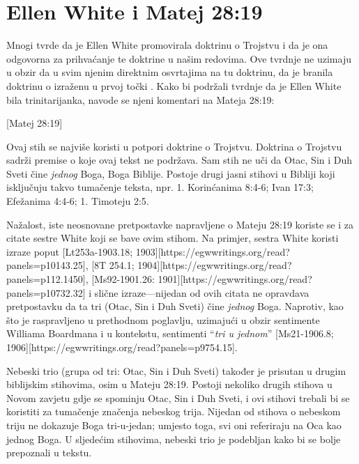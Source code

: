 \chapter{Ellen White i Matej 28:19}

Mnogi tvrde da je Ellen White promovirala doktrinu o Trojstvu i da je ona odgovorna za prihvaćanje te doktrine u našim redovima. Ove tvrdnje ne uzimaju u obzir da u svim njenim direktnim osvrtajima na tu doktrinu, da je branila  doktrinu o  izraženu u prvoj točki . Kako bi podržali tvrdnje da je Ellen White bila trinitarijanka, navode se njeni komentari na Mateja 28:19:

[Matej 28:19]

Ovaj stih se najviše koristi u potpori doktrine o Trojstvu. Doktrina o Trojstvu sadrži premise o  koje ovaj tekst ne podržava. Sam stih ne uči da Otac, Sin i Duh Sveti čine \textit{jednog} Boga, Boga Biblije. Postoje drugi jasni stihovi u Bibliji koji isključuju takvo tumačenje teksta, npr. 1. Korinćanima 8:4-6; Ivan 17:3; Efežanima 4:4-6; 1. Timoteju 2:5.

Nažalost, iste neosnovane pretpostavke napravljene o Mateju 28:19 koriste se i za citate sestre White koji se bave ovim stihom. Na primjer, sestra White koristi izraze poput [Lt253a-1903.18; 1903][https://egwwritings.org/read?panels=p10143.25], [8T 254.1; 1904][https://egwwritings.org/read?panels=p112.1450], [Ms92-1901.26: 1901][https://egwwritings.org/read?panels=p10732.32] i slične izraze—nijedan od ovih citata ne opravdava pretpostavku da ta tri (Otac, Sin i Duh Sveti) čine \textit{jednog} Boga. Naprotiv, kao što je raspravljeno u prethodnom poglavlju, uzimajući u obzir sentimente Williama Boardmana i  u kontekstu, sentimenti “\textit{tri u jednom}” [Ms21-1906.8; 1906][https://egwwritings.org/read?panels=p9754.15].

Nebeski trio (grupa od tri: Otac, Sin i Duh Sveti) također je prisutan u drugim biblijskim stihovima, osim u Mateju 28:19. Postoji nekoliko drugih stihova u Novom zavjetu gdje se spominju Otac, Sin i Duh Sveti, i ovi stihovi trebali bi se koristiti za tumačenje značenja nebeskog trija. Nijedan od stihova o nebeskom triju ne dokazuje Boga tri-u-jedan; umjesto toga, svi oni referiraju na Oca kao jednog Boga. U sljedećim stihovima, nebeski trio je podebljan kako bi se bolje prepoznali u tekstu.

